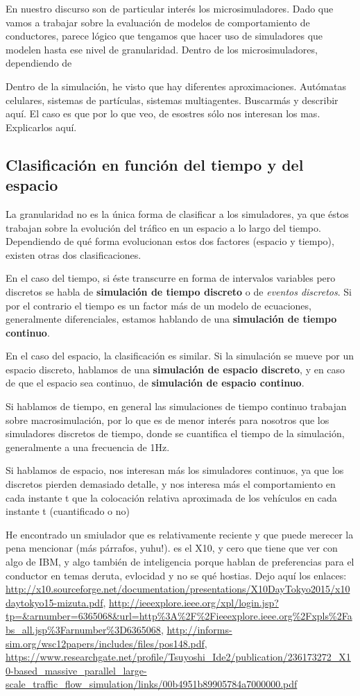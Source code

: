 En nuestro discurso son de particular interés los microsimuladores. Dado que vamos a trabajar sobre la evaluación de modelos de comportamiento de conductores, parece lógico que tengamos que hacer uso de simuladores que modelen hasta ese nivel de granularidad. Dentro de los microsimuladores, dependiendo de 

Dentro de la simulación, he visto que hay diferentes aproximaciones. Autómatas celulares, sistemas de partículas, sistemas multiagentes. Buscarmás y describir aquí. El caso es que por lo que veo, de esostres sólo nos interesan los mas. Explicarlos aquí.

\subsection{Clasificación en función del tiempo y del espacio}

La granularidad no es la única forma de clasificar a los simuladores, ya que éstos trabajan sobre la evolución del tráfico en un espacio a lo largo del tiempo. Dependiendo de qué forma evolucionan estos dos factores (espacio y tiempo), existen otras dos clasificaciones.

En el caso del tiempo, si éste transcurre en forma de intervalos variables pero discretos se habla de \textbf{simulación de tiempo discreto} o de \textit{eventos discretos}. Si por el contrario el tiempo es un factor más de un modelo de ecuaciones, generalmente diferenciales, estamos hablando de una \textbf{simulación de tiempo continuo}.

En el caso del espacio, la clasificación es similar. Si la simulación se mueve por un espacio discreto, hablamos de una \textbf{simulación de espacio discreto}, y en caso de que el espacio sea continuo, de \textbf{simulación de espacio continuo}. 

Si hablamos de tiempo, en general las simulaciones de tiempo continuo trabajan sobre macrosimulación, por lo que es de menor interés para nosotros que los simuladores discretos de tiempo, donde se cuantifica el tiempo de la simulación, generalmente a una frecuencia de 1Hz.

Si hablamos de espacio, nos interesan más los simuladores continuos, ya que los discretos pierden demasiado detalle, y nos interesa más el comportamiento en cada instante t que la colocación relativa aproximada de los vehículos en cada instante t (cuantificado o no)

He encontrado un smiulador que es relativamente reciente y que puede merecer la pena mencionar (más párrafos, yuhu!). es el X10, y cero que tiene que ver con algo de IBM, y algo también de inteligencia porque hablan de preferencias para el conductor en temas deruta, evlocidad y no se qué hostias. Dejo aquí los enlaces: \url{http://x10.sourceforge.net/documentation/presentations/X10DayTokyo2015/x10daytokyo15-mizuta.pdf}, \url{http://ieeexplore.ieee.org/xpl/login.jsp?tp=\&arnumber=6365068\&url=http\%3A\%2F\%2Fieeexplore.ieee.org\%2Fxpls\%2Fabs\_all.jsp\%3Farnumber\%3D6365068}, \url{http://informs-sim.org/wsc12papers/includes/files/pos148.pdf}, \url{https://www.researchgate.net/profile/Tsuyoshi\_Ide2/publication/236173272\_X10-based\_massive\_parallel\_large-scale\_traffic\_flow\_simulation/links/00b4951b89905784a7000000.pdf}

